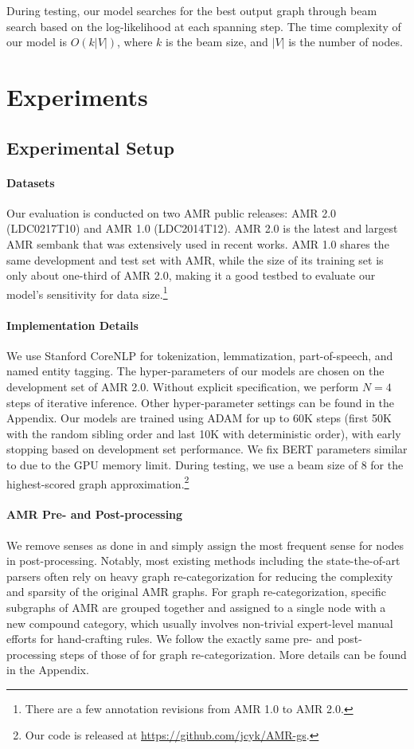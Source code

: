 \documentclass[11pt,a4paper]{article}
\begin{document}
	During testing, our model searches for the best output graph through beam search based on the log-likelihood at each spanning step. The time complexity of our model is $O(k|V|)$, where $k$ is the beam size, and $|V|$ is the number of nodes.
	\section{Experiments}
	\subsection{Experimental Setup}
	\paragraph{Datasets} Our evaluation is conducted on two AMR public releases: AMR 2.0 (LDC0217T10) and AMR 1.0 (LDC2014T12). AMR 2.0 is the latest and largest AMR sembank that was extensively used in recent works. AMR 1.0 shares the same development and test set with AMR, while the size of its training set is only about one-third of AMR 2.0, making it a good testbed to evaluate our model's sensitivity for data size.\footnote{There are a few annotation revisions from AMR 1.0 to AMR 2.0.}
	\paragraph{Implementation Details } We use Stanford CoreNLP \cite{manning2014stanford} for tokenization, lemmatization, part-of-speech, and named entity tagging. The hyper-parameters of our models are chosen on the development set of AMR 2.0. Without explicit specification, we perform $N=4$ steps of iterative inference. Other hyper-parameter settings can be found in the Appendix. Our models are trained using ADAM \cite{kingma2014adam} for up to 60K steps (first 50K with the random sibling order and last 10K with deterministic order), with early stopping based on development set performance. We fix BERT parameters similar to  due to the GPU memory limit. During testing, we use a beam size of 8 for the highest-scored graph approximation.\footnote{Our code is released at \url{https://github.com/jcyk/AMR-gs}.}
	\paragraph{AMR Pre- and Post-processing} We remove senses as done in  and simply assign the most frequent sense for nodes in post-processing. Notably, most existing methods including the state-the-of-art parsers \cite[][inter alia]{zhang-etal-2019-amr,zhang-etal-2019-broad,lyu2018amr,guo2018better} often rely on heavy graph re-categorization for reducing the complexity and sparsity of the original AMR graphs. For graph re-categorization, specific subgraphs of AMR are grouped together and assigned to a single node with a new compound category, which usually involves non-trivial expert-level manual efforts for hand-crafting rules. We follow the exactly same pre- and post-processing steps of those of  for graph re-categorization. More details can be found in the Appendix.
\end{document}
